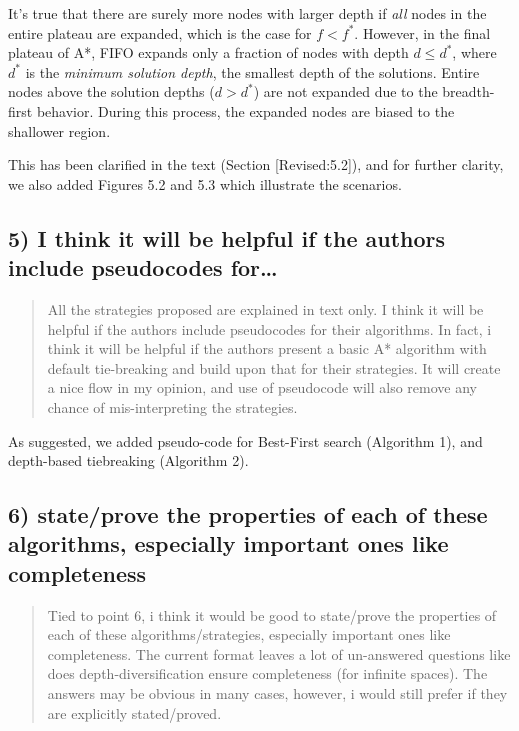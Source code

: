 \documentclass{article}
\begin{document}
It's true that there are surely more nodes with larger depth if \emph{all} nodes in the entire plateau are expanded, which is the case for \(f<f^*\).
However, in the final plateau of A*, FIFO expands only a fraction of nodes with depth \(d\leq d^*\),
where \(d^*\) is the \emph{minimum solution depth}, the smallest depth of the solutions.
Entire nodes above the solution depths (\(d>d^*\)) are not expanded due to the breadth-first behavior.
During this process, the expanded nodes are biased to the shallower region.

This has been clarified in the text (Section [Revised:5.2]), and 
for further clarity, we also added Figures 5.2 and 5.3 which illustrate the scenarios.


\subsection{5) I think it will be helpful if the authors include pseudocodes for\ldots{}}
\label{sec:orgheadline19}

\begin{quote}
 All the strategies proposed are explained in text only. I think it
will be helpful if the authors include pseudocodes for their
algorithms. In fact, i think it will be helpful if the authors present
a basic A* algorithm with default tie-breaking and build upon that for
their strategies. It will create a nice flow in my opinion, and use of
pseudocode will also remove any chance of mis-interpreting the
strategies.
\end{quote}

As suggested, we added pseudo-code for  Best-First search (Algorithm 1), and depth-based tiebreaking (Algorithm 2).


\subsection{6) state/prove the properties of each of these algorithms, especially important ones like completeness}
\label{sec:orgheadline20}

\begin{quote}
 Tied to point 6, i think it would be good to state/prove the
properties of each of these algorithms/strategies, especially
important ones like completeness. The current format leaves a lot of
un-answered questions like does depth-diversification ensure
completeness (for infinite spaces). The answers may be obvious in many
cases, however, i would still prefer if they are explicitly
stated/proved.
\end{quote}
\end{document}
